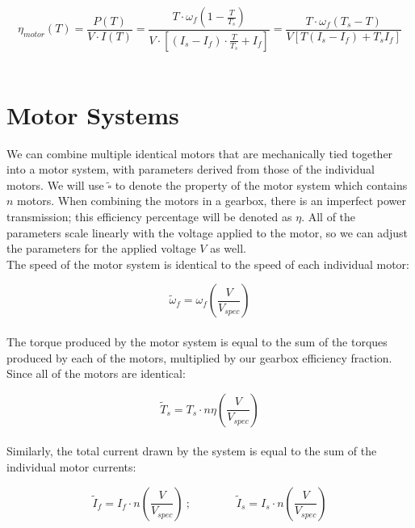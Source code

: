 \documentclass[a4paper]{article}
\begin{document}
	\begin{equation}
		\eta_{motor} (T) = \frac{P(T)}{V \cdot I (T)}
		= \frac{T \cdot \omega_f \left( 1 - \frac{T}{T_s} \right)}{V \cdot \left[ \left( I_s - I_f \right) \cdot \frac{T}{T_s} + I_f \right]}
		= \frac{T \cdot \omega_f \left( T_s - T \right)}{V \left[ T \left( I_s - I_f \right) + T_s I_f \right]}
	\end{equation}\\
	
	
	\section{Motor Systems}
	
	We can combine multiple identical motors that are mechanically tied together into a motor system, with parameters derived from those of the individual motors. We will use $ \widetilde{\square} $ to denote the property of the motor system which contains $ n $ motors. When combining the motors in a gearbox, there is an imperfect power transmission; this efficiency percentage will be denoted as $ \eta $. All of the parameters scale linearly with the voltage applied to the motor, so we can adjust the parameters for the applied voltage $ V $ as well. \\
	
	The speed of the motor system is identical to the speed of each individual motor:
	
	\begin{equation}
		\widetilde{\omega}_f = \omega_f \left( \frac{V}{V_{spec}} \right)
	\end{equation}\\
	
	\newpage
	The torque produced by the motor system is equal to the sum of the torques produced by each of the motors, multiplied by our gearbox efficiency fraction. Since all of the motors are identical:
	
	\begin{equation}
		\widetilde{T}_s = T_s \cdot n \eta \left( \frac{V}{V_{spec}} \right)
	\end{equation}\\
	
	Similarly, the total current drawn by the system is equal to the sum of the individual motor currents:
	
	\begin{equation}
		\widetilde{I}_f = I_f \cdot n \left( \frac{V}{V_{spec}} \right)\ ; \qquad\qquad \widetilde{I}_s = I_s \cdot n \left( \frac{V}{V_{spec}} \right)
	\end{equation}\\
	
\end{document}
